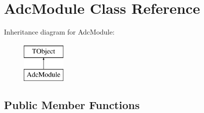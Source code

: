 \hypertarget{class_adc_module}{\section{Adc\-Module Class Reference}
\label{class_adc_module}
}
Inheritance diagram for Adc\-Module\-:\begin{figure}[H]
\begin{center}
\leavevmode
\includegraphics[height=2.000000cm]{class_adc_module}
\end{center}
\end{figure}
\subsection*{Public Member Functions}
